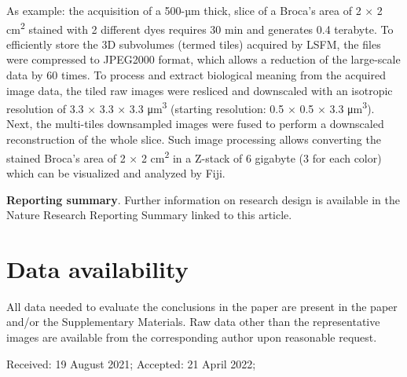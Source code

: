 \documentclass{article}
\begin{document}
As example: the acquisition of a 500-µm thick, slice of a Broca’s area of 2 × 2 cm\textsuperscript{2} stained with 2 different dyes requires 30 min and generates 0.4 terabyte. To efficiently store the 3D subvolumes (termed tiles) acquired by LSFM, the files were compressed to JPEG2000 format, which allows a reduction of the large-scale data by 60 times. To process and extract biological meaning from the acquired image data, the tiled raw images were resliced and downscaled with an isotropic resolution of 3.3 × 3.3 × 3.3 μm\textsuperscript{3} (starting resolution: 0.5 × 0.5 × 3.3 μm\textsuperscript{3}). Next, the multi-tiles downsampled images were fused to perform a downscaled reconstruction of the whole slice. Such image processing allows converting the stained Broca’s area of 2 × 2 cm\textsuperscript{2} in a Z-stack of 6 gigabyte (3 for each color) which can be visualized and analyzed by Fiji.

\textbf{Reporting summary}. Further information on research design is available in the Nature Research Reporting Summary linked to this article.

\section*{Data availability}

All data needed to evaluate the conclusions in the paper are present in the paper and/or the Supplementary Materials. Raw data other than the representative images are available from the corresponding author upon reasonable request.

Received: 19 August 2021; Accepted: 21 April 2022;
\end{document}
